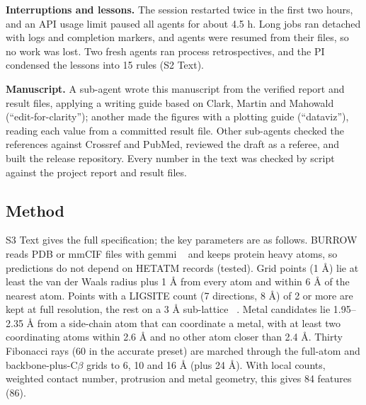 \documentclass[10pt,letterpaper]{article}
\begin{document}
\textbf{Interruptions and lessons.} The session restarted twice in the first two hours, and an API usage limit paused all agents for about 4.5 h. Long jobs ran detached with logs and completion markers, and agents were resumed from their files, so no work was lost. Two fresh agents ran process retrospectives, and the PI condensed the lessons into 15 rules (S2 Text).

\textbf{Manuscript.} A sub-agent wrote this manuscript from the verified report and result files, applying a writing guide based on Clark, Martin and Mahowald ~\cite{clark2026} (``edit-for-clarity''); another made the figures with a plotting guide (``dataviz''), reading each value from a committed result file. Other sub-agents checked the references against Crossref and PubMed, reviewed the draft as a referee, and built the release repository. Every number in the text was checked by script against the project report and result files.

\subsection*{Method}

S3 Text gives the full specification; the key parameters are as follows. BURROW reads PDB or mmCIF files with gemmi ~\cite{wojdyr2022} and keeps protein heavy atoms, so predictions do not depend on HETATM records (tested). Grid points (1 \AA{}) lie at least the van der Waals radius plus 1 \AA{} from every atom and within 6 \AA{} of the nearest atom. Points with a LIGSITE count (7 directions, 8 \AA{}) of 2 or more are kept at full resolution, the rest on a 3 \AA{} sub-lattice ~\cite{hendlich1997}. Metal candidates lie 1.95--2.35 \AA{} from a side-chain atom that can coordinate a metal, with at least two coordinating atoms within 2.6 \AA{} and no other atom closer than 2.4 \AA{}. Thirty Fibonacci rays (60 in the accurate preset) are marched through the full-atom and backbone-plus-C$\beta$ grids to 6, 10 and 16 \AA{} (plus 24 \AA{}). With local counts, weighted contact number, protrusion and metal geometry, this gives 84 features (86).
\end{document}
